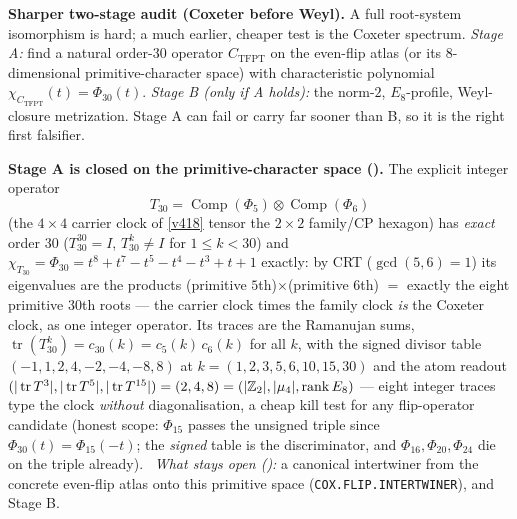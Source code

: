 \noindent\textbf{Sharper two-stage audit (Coxeter before Weyl).} A full root-system isomorphism is
hard; a much earlier, cheaper test is the Coxeter spectrum. \emph{Stage A:} find a natural order-$30$
operator $C_{\mathrm{TFPT}}$ on the even-flip atlas (or its $8$-dimensional primitive-character space)
with characteristic polynomial $\chi_{C_{\mathrm{TFPT}}}(t)=\Phi_{30}(t)$. \emph{Stage B (only if A
holds):} the norm-$2$, $E_8$-profile, Weyl-closure metrization. Stage A can fail or carry far sooner
than B, so it is the right first falsifier.
\par\smallskip\noindent\textbf{Stage A is closed on the primitive-character space
().} The explicit integer operator
\[
  T_{30}=\operatorname{Comp}(\Phi_5)\otimes\operatorname{Comp}(\Phi_6)
\]
(the $4{\times}4$ carrier clock of \vref{v418} tensor the $2{\times}2$ family/CP hexagon) has \emph{exact}
order $30$ ($T_{30}^{30}=I$, $T_{30}^k\neq I$ for $1\le k<30$) and
$\chi_{T_{30}}=\Phi_{30}=t^8+t^7-t^5-t^4-t^3+t+1$ exactly: by CRT ($\gcd(5,6)=1$) its eigenvalues are the
products (primitive $5$th)$\times$(primitive $6$th) $=$ exactly the eight primitive $30$th roots --- the
carrier clock times the family clock \emph{is} the Coxeter clock, as one integer operator. Its traces are
the Ramanujan sums, $\operatorname{tr}(T_{30}^k)=c_{30}(k)=c_5(k)\,c_6(k)$ for all $k$, with the signed
divisor table $(-1,1,2,4,-2,-4,-8,8)$ at $k=(1,2,3,5,6,10,15,30)$ and the atom readout
$(|\operatorname{tr}T^3|,|\operatorname{tr}T^5|,|\operatorname{tr}T^{15}|)=(2,4,8)
=(|\mathbb{Z}_2|,|\mu_4|,\operatorname{rank}E_8)$ --- eight integer traces type the clock \emph{without}
diagonalisation, a cheap kill test for any flip-operator candidate (honest scope: $\Phi_{15}$ passes the
unsigned triple since $\Phi_{30}(t)=\Phi_{15}(-t)$; the \emph{signed} table is the discriminator, and
$\Phi_{16},\Phi_{20},\Phi_{24}$ die on the triple already). \mE\ \emph{What stays open (\mO):} a canonical
intertwiner from the concrete even-flip atlas onto this primitive space
(\texttt{COX.FLIP.INTERTWINER}), and Stage B.


